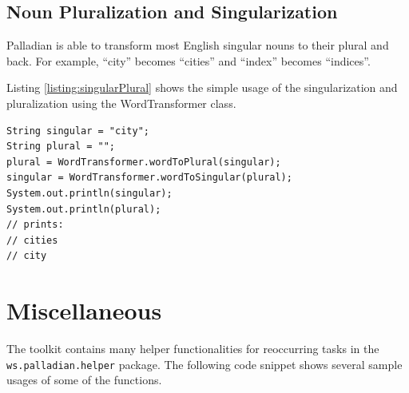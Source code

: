 \subsection{Noun Pluralization and Singularization}
Palladian is able to transform most English singular nouns to their plural and back. For example, ``city'' becomes ``cities'' and ``index'' becomes ``indices''.

Listing \ref{listing:singularPlural} shows the simple usage of the singularization and pluralization using the WordTransformer class.

\begin{codelisting}
\begin{lstlisting}[label=listing:singularPlural,caption=Transforming words from singular to plural and vice versa.,frame=tb]
String singular = "city";
String plural = "";
plural = WordTransformer.wordToPlural(singular);
singular = WordTransformer.wordToSingular(plural);
System.out.println(singular);
System.out.println(plural);
// prints:
// cities
// city
\end{lstlisting}
\end{codelisting}

\section{Miscellaneous}
The toolkit contains many helper functionalities for reoccurring tasks in the \texttt{ws.palladian.helper} package. The following code snippet shows several sample usages of some of the functions.

